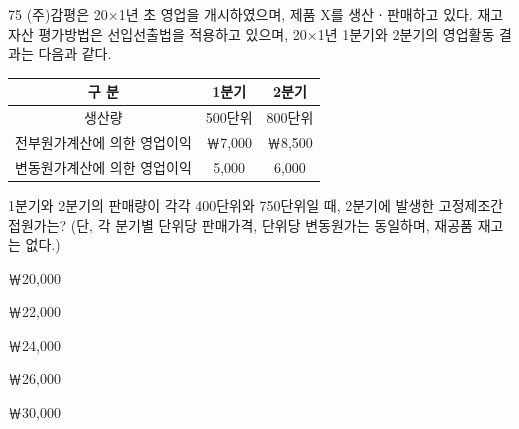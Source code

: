 \begin{question}{75}
(주)감평은 20×1년 초 영업을 개시하였으며, 제품 X를 생산ㆍ판매하고 있다. 재고자산 평가방법은 선입선출법을 적용하고 있으며, 20×1년 1분기와 2분기의 영업활동 결과는 다음과 같다.
\par{\small\centering\begin{tabular}{|c|c|c|}\hline
구 분 & 1분기 & 2분기 \tabularnewline\hline
생산량 & 500단위 & 800단위 \tabularnewline\hline
전부원가계산에 의한 영업이익 & ￦7,000 & ￦8,500 \tabularnewline\hline
변동원가계산에 의한 영업이익 & 5,000 & 6,000 \tabularnewline\hline
\end{tabular}\par}
1분기와 2분기의 판매량이 각각 400단위와 750단위일 때, 2분기에 발생한 고정제조간접원가는? (단, 각 분기별 단위당 판매가격, 단위당 변동원가는 동일하며, 재공품 재고는 없다.)
\begin{choices}
  \item ￦20,000
  \item ￦22,000
  \item ￦24,000
  \item ￦26,000
  \item ￦30,000
\end{choices}
\end{question}
